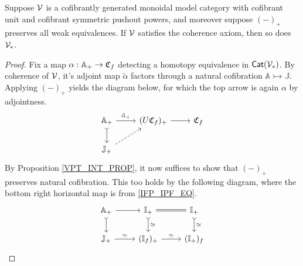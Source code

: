 \documentclass[a4paper,10pt
,draft
]{article}%
\newcommand{\I}{\mathbb I}
\newcommand{\J}{\mathbb J}
\renewcommand{\1}{\eta}%
\begin{document}
\begin{proposition}
      \label{PT_COH_PROP}
      Suppose $\mathcal V$ is a cofibrantly generated monoidal model category with cofibrant unit and cofibrant symmetric pushout powers,
      and moreover suppose $(-)_+$ preserves all weak equivalences.
      If $\mathcal V$ satisfies the coherence axiom, then so does $\V_{\**}$.
\end{proposition}
\begin{proof}
      Fix a map $\alpha:\mathbb A_+ \to \mathfrak C_f$ detecting a homotopy equivalence in $\Cat(\V_{\**})$.
      By coherence of $\mathcal V$, it's adjoint map $\tilde \alpha$
      factors through a natural cofibration $\mathbb A \rightarrowtail \J$.
      Applying $(-)_+$ yields the diagram below, for which the top arrow is again $\alpha$ by adjointness.
      \begin{equation}
            \begin{tikzcd}
                  \mathbb A_+ \arrow[d, rightarrowtail] \arrow[r, "\tilde{\alpha}_+"]
                  &
                  (U \C_f)_+ \arrow[r]
                  &
                  \C_f
                  \\
                  \J_+ \arrow[ur, dashed]
            \end{tikzcd}
      \end{equation}
      By Proposition \ref{VPT_INT_PROP}, it now suffices to show that $(-)_+$ preserves natural cofibration.
      This too holds by the following diagram, where the bottom right horizontal map is from \eqref{IFP_IPF_EQ}.
      \begin{equation}
            \begin{tikzcd}
                  \mathbb A_+ \arrow[d, rightarrowtail] \arrow[r]
                  &
                  \I_+ \arrow[d, rightarrowtail, "\simeq"] \arrow[r, equal]
                  &
                  \I_+ \arrow[d, rightarrowtail, "\simeq"]
                  \\
                  \J_+ \arrow[r, "\simeq"]
                  &
                  (\I_f)_+ \arrow[r, "\simeq"]
                  &
                  (\I_+)_f
            \end{tikzcd}
      \end{equation}
\end{proof}
\end{document}

